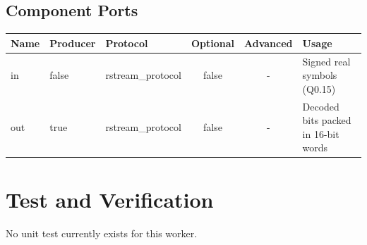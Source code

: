 \documentclass{article}
\begin{document}
\begin{landscape}
	\section*{Component Ports}
	\begin{scriptsize}
		\begin{tabular}{|M{2cm}|M{1.5cm}|M{4cm}|c|c|M{9cm}|}
			\hline
			Name & Producer & Protocol          & Optional & Advanced & Usage               \\
			\hline
			in   & false    & rstream\_protocol & false    & -        & Signed real symbols (Q0.15) \\
			\hline
			out  & true     & rstream\_protocol & false    & -        & Decoded bits packed in 16-bit words \\
			\hline
		\end{tabular}
	\end{scriptsize}
\end{landscape}

\section*{Test and Verification}
\normalsize
No unit test currently exists for this worker.
\end{document}
